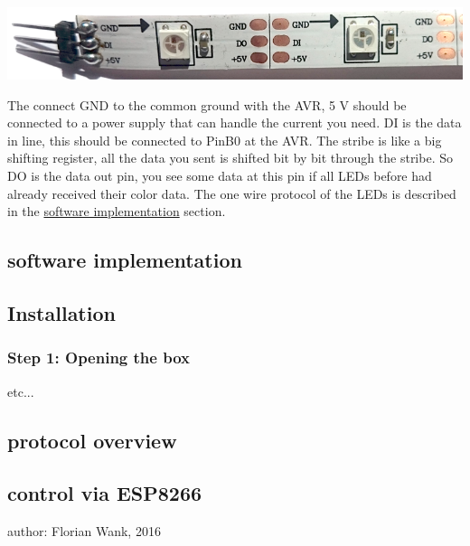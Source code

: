 \begin{DoxyImage}
\includegraphics[width=\textwidth,height=\textheight/2,keepaspectratio=true]{WS2812.png}
\caption{W\+S2812 stribe with pin header}
\end{DoxyImage}
The connect G\+N\+D to the common ground with the A\+V\+R, 5 V should be connected to a power supply that can handle the current you need. D\+I is the data in line, this should be connected to Pin\+B0 at the A\+V\+R. The stribe is like a big shifting register, all the data you sent is shifted bit by bit through the stribe. So D\+O is the data out pin, you see some data at this pin if all L\+E\+Ds before had already received their color data. The one wire protocol of the L\+E\+Ds is described in the \hyperlink{index_software_sec}{software implementation} section.\hypertarget{index_software_sec}{}\subsection{software implementation}\label{index_software_sec}
\hypertarget{index_install_sec}{}\subsection{Installation}\label{index_install_sec}
\hypertarget{index_step1}{}\subsubsection{Step 1\+: Opening the box}\label{index_step1}
etc...\hypertarget{index_protocol_sec}{}\subsection{protocol overview}\label{index_protocol_sec}
\hypertarget{index_esp_sec}{}\subsection{control via E\+S\+P8266}\label{index_esp_sec}
author\+: Florian Wank, 2016 